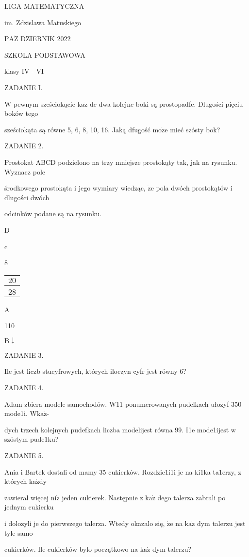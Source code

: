 \documentclass[a4paper,12pt]{article}
\begin{document}
LIGA MATEMATYCZNA

im. Zdzislawa Matuskiego

$\mathrm{P}\mathrm{A}\dot{\mathrm{Z}}$ DZIERNIK 2022

SZKOLA PODSTAWOWA

klasy IV - VI

ZADANIE I.

$\mathrm{W}$ pewnym sześciokącie $\mathrm{k}\mathrm{a}\dot{\mathrm{z}}$ de dwa kolejne boki są prostopadfe. Dlugości pięciu boków tego

sześciokąta są równe 5, 6, 8, 10, 16. Jaką dfugość $\mathrm{m}\mathrm{o}\dot{\mathrm{z}}\mathrm{e}$ mieć szósty bok?

ZADANIE 2.

Prostokat ABCD podzielono na trzy mniejsze prostokąty tak, jak na rysunku. Wyznacz pole

środkowego prostokąta i jego wymiary wiedząc, $\dot{\mathrm{z}}\mathrm{e}$ pola dwóch prostokątów i dlugości dwóch

odcinków podane są na rysunku.

D

c

8
\begin{center}
\begin{tabular}{|l|}
\hline
\multicolumn{1}{|l|}{$20$}	\\
\hline
\multicolumn{1}{|l|}{}	\\
\hline
\multicolumn{1}{|l|}{ $28$}	\\
\hline
\end{tabular}

\end{center}
A

110

$\mathrm{B}\downarrow$

ZADANIE 3.

Ile jest liczb stucyfrowych, których iloczyn cyfr jest równy 6?

ZADANIE 4.

Adam zbiera modele samochodów. $\mathrm{W}11$ ponumerowanych pudelkach ułozyf 350 mode1i. $\mathrm{W}\mathrm{k}\mathrm{a}\dot{\mathrm{z}}$-

dych trzech kolejnych pudefkach liczba modelijest równa 99. I1e mode1ijest w szóstym pude1ku?

ZADANIE 5.

Ania i Bartek dostali od mamy 35 cukierków. Rozdzie1i1i je na ki1ka ta1erzy, z których $\mathrm{k}\mathrm{a}\dot{\mathrm{z}}\mathrm{d}\mathrm{y}$

zawieral więcej $\mathrm{n}\mathrm{i}\dot{\mathrm{z}}$ jeden cukierek. Następnie z $\mathrm{k}\mathrm{a}\dot{\mathrm{z}}$ dego talerza zabrali po jednym cukierku

i dolozyli je do pierwszego talerza. Wtedy okazalo się, $\dot{\mathrm{z}}\mathrm{e}$ na $\mathrm{k}\mathrm{a}\dot{\mathrm{z}}$ dym talerzu jest tyle samo

cukierków. Ile cukierków bylo początkowo na $\mathrm{k}\mathrm{a}\dot{\mathrm{z}}$ dym talerzu?
\end{document}
